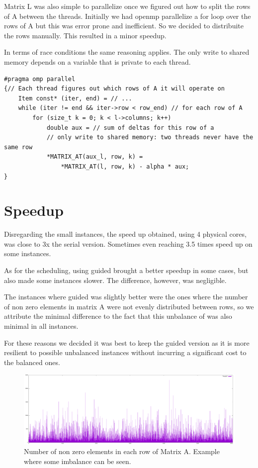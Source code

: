 \documentclass[a4paper]{article}
\begin{document}
Matrix L was also simple to parallelize once we figured out how to split the
rows of A between the threads. Initially we had openmp parallelize a for loop
over the rows of A but this was error prone and inefficient. So we decided to
distribuite the rows manually. This resulted in a minor speedup.

In terms of race conditions the same reasoning applies. The only write to shared
memory depends on a variable that is private to each thread.

\begin{verbatim}
#pragma omp parallel
{// Each thread figures out which rows of A it will operate on
    Item const* (iter, end) = // ...
    while (iter != end && iter->row < row_end) // for each row of A
        for (size_t k = 0; k < l->columns; k++)
            double aux = // sum of deltas for this row of a
            // only write to shared memory: two threads never have the same row
            *MATRIX_AT(aux_l, row, k) =
                *MATRIX_AT(l, row, k) - alpha * aux;
}
\end{verbatim}

\section{Speedup}
Disregarding the small instances, the speed up obtained, using 4 physical cores,
was close to 3x the serial version. Sometimes even reaching 3.5 times speed up
on some instances.

As for the scheduling, using guided brought a better speedup in some cases, but
also made some instances slower. The difference, however, was negligible.

The instances where guided was slightly better were the ones where the number of
non zero elements in matrix A were not evenly distributed between rows, so we
attribute the minimal difference to the fact that this unbalance of was also
minimal in all instances.

For these reasons we decided it was best to keep the guided version as it is more
resilient to possible unbalanced instances without incurring a significant cost
to the balanced ones.

\begin{figure}[H]
    \centering
        \includegraphics[width=\textwidth]{./ML1M.png}
        \caption{Number of non zero elements in each row of Matrix A.
        Example where some imbalance can be seen.}
\end{figure}
\end{document}
